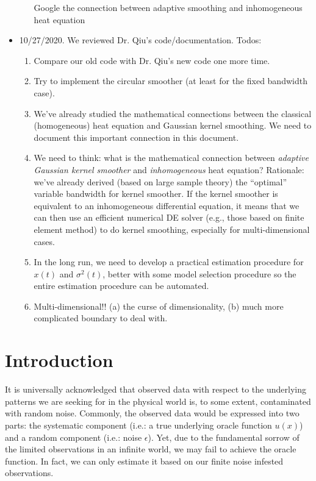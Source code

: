 \documentclass{article}
\begin{document}
\begin{itemize}
\begin{enumerate}
    Google the connection between adaptive smoothing and inhomogeneous heat equation 
  \end{enumerate} 



\item 10/27/2020. We reviewed Dr. Qiu's code/documentation. Todos:
  \begin{enumerate}
  \item Compare our old code with Dr. Qiu's new code one more time.
  \item Try to implement the circular smoother (at least for the fixed bandwidth case).
  \item We've already studied the mathematical connections between the classical (homogeneous) heat equation and Gaussian kernel smoothing. We need to document this important connection in this document.
  \item We need to think: what is the mathematical connection between \emph{adaptive Gaussian kernel smoother} and \emph{inhomogeneous} heat equation?  Rationale: we've already derived (based on large sample theory) the ``optimal'' variable bandwidth for kernel smoother. If the kernel smoother is equivalent to an inhomogeneous differential equation, it means that we can then use an efficient numerical DE solver (e.g., those based on finite element method) to do kernel smoothing, especially for multi-dimensional cases.
  \item In the long run, we need to develop a practical estimation procedure for $x(t)$ and $\sigma^{2}(t)$, better with some model selection procedure so the entire estimation procedure can be automated.
  \item Multi-dimensional!! (a) the curse of dimensionality, (b) much more complicated boundary to deal with.
  \end{enumerate}
\end{itemize}


\section{Introduction}
 
It is universally acknowledged that observed data with respect to the underlying patterns we are seeking for in the physical world is, to some extent, contaminated with random noise. Commonly, the observed data would be expressed into two parts: the systematic component (i.e.: a true underlying oracle function $u(x)$) and a random component (i.e.: noise $\epsilon$). Yet, due to the fundamental sorrow of the limited observations in an infinite world, we may fail to achieve the oracle function. In fact, we can only estimate it based on our finite noise infested observations. 
\end{document}
